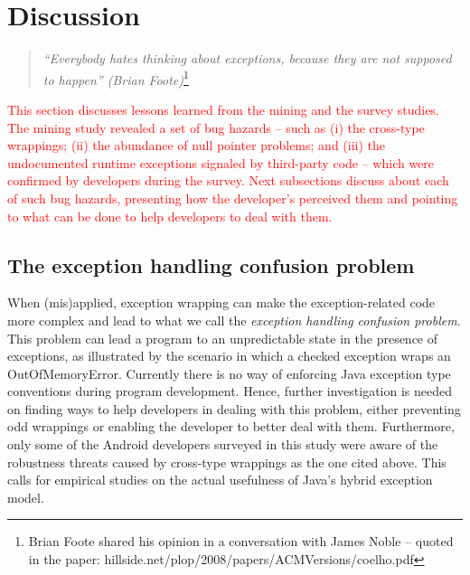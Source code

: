 \bigskip 

\section{Discussion}
\label{sec:disc}

\begin{quotation}
\noindent
 \emph{``Everybody hates thinking about exceptions, because they are not supposed to happen'' 
  (Brian Foote)}\footnote{Brian Foote shared his opinion in a conversation with James Noble -- quoted in the paper: hillside.net/plop/2008/papers/ACMVersions/coelho.pdf}
\end{quotation}

\textcolor{red}{This section discusses lessons learned from the mining and the survey studies. The mining study revealed a set of bug 
hazards -- such as (i) the cross-type wrappings; (ii) the abundance of null pointer problems; and (iii) the undocumented runtime 
exceptions signaled by third-party code -- which were confirmed by developers during the survey. Next subsections discuss about each of such bug hazards, presenting how the developer's perceived them and pointing to what can be done to help developers 
to deal with them.}


\subsection{The exception handling confusion problem}
When (mis)applied, exception wrapping can make the exception-related code
 more complex and lead to what we call the \emph{exception handling confusion problem}.
This problem can lead a program to an unpredictable state in the presence of exceptions,
as illustrated by the scenario in which a checked exception wraps an OutOfMemoryError. 
Currently there is no way of enforcing Java exception type conventions during program development.
Hence, further investigation is needed on finding ways to help developers in dealing with this
 problem, either preventing odd wrappings or enabling the developer to
 better deal with them.
Furthermore, only some of the Android developers surveyed in this study were aware of the 
robustness threats caused by cross-type wrappings as the one cited above. This calls for empirical studies on the actual usefulness of Java's hybrid exception model. 



